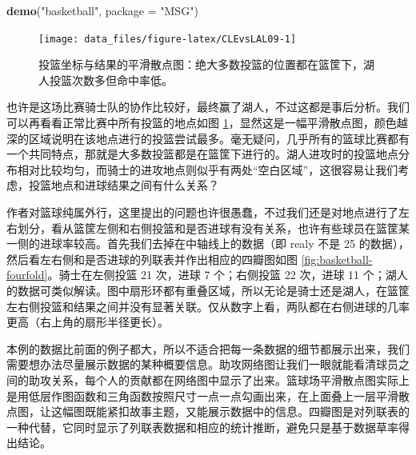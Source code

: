 \documentclass[
  b5paper,
  UTF8,twoside]{book}
\newenvironment{Shaded}{\begin{snugshade}}{\end{snugshade}}
\newcommand{\AttributeTok}[1]{\textcolor[rgb]{0.13,0.29,0.53}{#1}}
\newcommand{\FunctionTok}[1]{\textcolor[rgb]{0.13,0.29,0.53}{\textbf{#1}}}
\newcommand{\NormalTok}[1]{#1}
\newcommand{\StringTok}[1]{\textcolor[rgb]{0.31,0.60,0.02}{#1}}
\begin{document}
\begin{Shaded}
\begin{Highlighting}[]
\FunctionTok{demo}\NormalTok{(}\StringTok{"basketball"}\NormalTok{, }\AttributeTok{package =} \StringTok{"MSG"}\NormalTok{)}
\end{Highlighting}
\end{Shaded}

\begin{figure}

{\centering \texttt{[image: data\_files/figure-latex/CLEvsLAL09-1]} 

}

\caption[ 投篮坐标与结果的平滑散点图 ]{投篮坐标与结果的平滑散点图：绝大多数投篮的位置都在篮筐下，湖人投篮次数多但命中率低。}\label{fig:CLEvsLAL09}
\end{figure}



也许是这场比赛骑士队的协作比较好，最终赢了湖人，不过这都是事后分析。我们可以再看看正常比赛中所有投篮的地点如图 \ref{fig:CLEvsLAL09}，显然这是一幅平滑散点图，颜色越深的区域说明在该地点进行的投篮尝试最多。毫无疑问，几乎所有的篮球比赛都有一个共同特点，那就是大多数投篮都是在篮筐下进行的。湖人进攻时的投篮地点分布相对比较均匀，而骑士的进攻地点则似乎有两处``空白区域''，这很容易让我们考虑，投篮地点和进球结果之间有什么关系？

作者对篮球纯属外行，这里提出的问题也许很愚蠢，不过我们还是对地点进行了左右划分，看从篮筐左侧和右侧投篮和是否进球有没有关系，也许有些球员在篮筐某一侧的进球率较高。首先我们去掉在中轴线上的数据（即 realy 不是 25 的数据），然后看左右侧和是否进球的列联表并作出相应的四瓣图如图 \ref{fig:basketball-fourfold}。骑士在左侧投篮 21 次，进球 7 个；右侧投篮 22 次，进球 11 个；湖人的数据可类似解读。图中扇形环都有重叠区域，所以无论是骑士还是湖人，在篮筐左右侧投篮和结果之间并没有显著关联。仅从数字上看，两队都在右侧进球的几率更高（右上角的扇形半径更长）。

本例的数据比前面的例子都大，所以不适合把每一条数据的细节都展示出来，我们需要想办法尽量展示数据的某种概要信息。助攻网络图让我们一眼就能看清球员之间的助攻关系，每个人的贡献都在网络图中显示了出来。篮球场平滑散点图实际上是用低层作图函数和三角函数按照尺寸一点一点勾画出来，在上面叠上一层平滑散点图，让这幅图既能紧扣故事主题，又能展示数据中的信息。四瓣图是对列联表的一种代替，它同时显示了列联表数据和相应的统计推断，避免只是基于数据草率得出结论。
\end{document}
